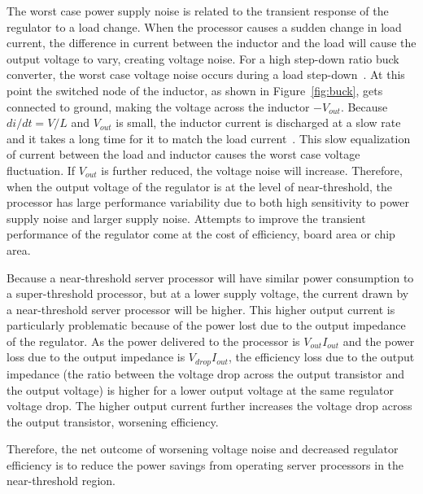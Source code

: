 The worst case power supply noise is related to the transient response of the regulator to a load change.
When the processor causes a sudden change in load current, the difference in current between the inductor and the load will cause the output voltage to vary, creating voltage noise.
For a high step-down ratio buck converter, the worst case voltage noise occurs during a load step-down~\cite{Transient}.
At this point the switched node of the inductor, as shown in Figure~\ref{fig:buck}, gets connected to ground, making the voltage across the inductor $-V_{out}$.
Because $di/dt=V/L$ and $V_{out}$ is small, the inductor current is discharged at a slow rate and it takes a long time for it to match the load current~\cite{g2010principles}.
This slow equalization of current between the load and inductor causes the worst case voltage fluctuation.
If $V_{out}$ is further reduced, the voltage noise will increase.
Therefore, when the output voltage of the regulator is at the level of near-threshold, the processor has large performance variability due to both high sensitivity to power supply noise and larger supply noise.
Attempts to improve the transient performance of the regulator come at the cost of efficiency, board area or chip area.


Because a near-threshold server processor will have similar power consumption to a super-threshold processor, but at a lower supply voltage, the current drawn by a near-threshold server processor will be higher.
This higher output current is particularly problematic because of the power lost due to the output impedance of the regulator.
As the power delivered to the processor is $V_{out}I_{out}$ and the power loss due to the output impedance is $V_{drop}I_{out}$, the efficiency loss due to the output impedance (the ratio between the voltage drop across the output transistor and the output voltage) is higher for a lower output voltage at the same regulator voltage drop.
The higher output current further increases the voltage drop across the output transistor, worsening efficiency.

Therefore, the net outcome of worsening voltage noise and decreased regulator efficiency is to reduce the power savings from operating server processors in the near-threshold region.
